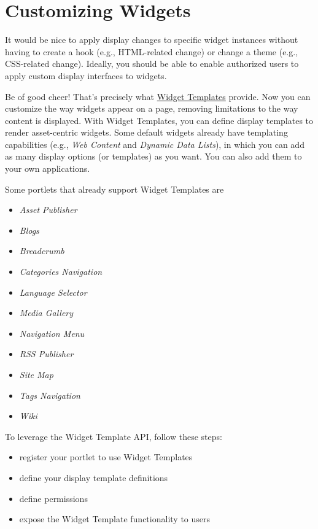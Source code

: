 \chapter{Customizing Widgets}\label{customizing-widgets}

It would be nice to apply display changes to specific widget instances
without having to create a hook (e.g., HTML-related change) or change a
theme (e.g., CSS-related change). Ideally, you should be able to enable
authorized users to apply custom display interfaces to widgets.

Be of good cheer! That's precisely what
\href{/docs/7-2/user/-/knowledge_base/u/styling-widgets-with-widget-templates}{Widget
Templates} provide. Now you can customize the way widgets appear on a
page, removing limitations to the way content is displayed. With Widget
Templates, you can define display templates to render asset-centric
widgets. Some default widgets already have templating capabilities
(e.g., \emph{Web Content} and \emph{Dynamic Data Lists}), in which you
can add as many display options (or templates) as you want. You can also
add them to your own applications.

Some portlets that already support Widget Templates are

\begin{itemize}
\tightlist
\item
  \emph{Asset Publisher}
\item
  \emph{Blogs}
\item
  \emph{Breadcrumb}
\item
  \emph{Categories Navigation}
\item
  \emph{Language Selector}
\item
  \emph{Media Gallery}
\item
  \emph{Navigation Menu}
\item
  \emph{RSS Publisher}
\item
  \emph{Site Map}
\item
  \emph{Tags Navigation}
\item
  \emph{Wiki}
\end{itemize}

To leverage the Widget Template API, follow these steps:

\begin{itemize}
\tightlist
\item
  register your portlet to use Widget Templates
\item
  define your display template definitions
\item
  define permissions
\item
  expose the Widget Template functionality to users
\end{itemize}

